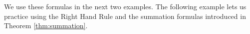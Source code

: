 We use these formulas in the next two examples.
%
%
%
%
%
The following example lets us practice using the Right Hand Rule and the summation formulas introduced in Theorem \ref{thm:summation}.\\

